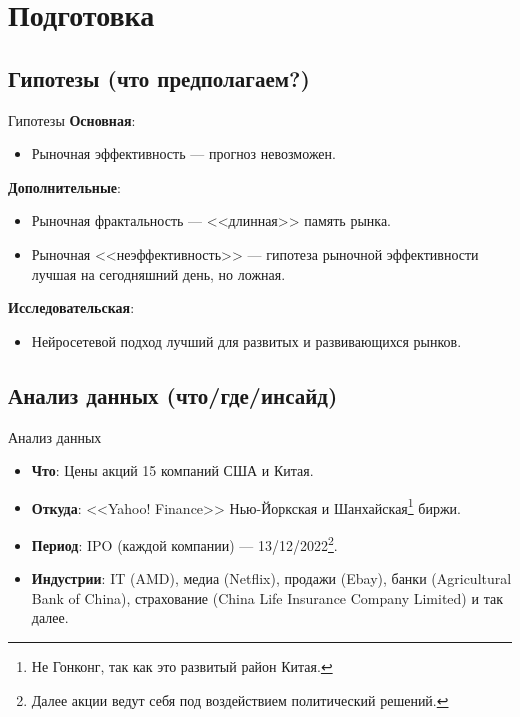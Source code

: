 \documentclass[11pt, aspectratio= 169]{beamer}
\begin{document}
	\section{Подготовка}
	\subsection{Гипотезы (что предполагаем?)}
	\begin{frame}{Гипотезы}
		\large
		\textbf{Основная}:
		\begin{itemize}
			\item Рыночная эффективность \cite{fama1970efficient} --- прогноз невозможен.
		\end{itemize}
		
		\textbf{Дополнительные}:
		\begin{itemize}
			\item Рыночная фрактальность \cite{mandelbrot2006misbehavior} --- <<длинная>> память рынка.
			\item Рыночная <<неэффективность>> \cite{matrin2011history} --- гипотеза рыночной эффективности лучшая на сегодняшний день, но ложная.
		\end{itemize}
	
		\textbf{Исследовательская}:
		\begin{itemize}
			\item Нейросетевой подход лучший для развитых и развивающихся рынков. 
		\end{itemize}
	\end{frame}
	
	\subsection{Анализ данных (что/где/инсайд)}
	\begin{frame}{Анализ данных}
		\Large
		\begin{itemize}
			\item[] \textbf{Что}: Цены акций 15 компаний США и Китая.
			\item[] \textbf{Откуда}: <<Yahoo! Finance>> Нью-Йоркская и Шанхайская\footnote{Не Гонконг, так как это развитый район Китая.} биржи.
			\item[] \textbf{Период}: IPO (каждой компании) --- 13/12/2022\footnote{Далее акции ведут себя под воздействием политический решений.}.
			\item[] \textbf{Индустрии}: IT (AMD), медиа (Netflix), продажи (Ebay), банки (Agricultural Bank of China), страхование (China Life Insurance Company Limited) и так далее.
		\end{itemize}
	\end{frame}
\end{document}
